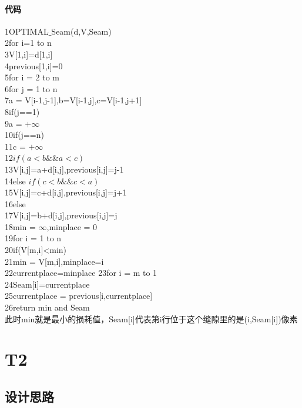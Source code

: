 \documentclass{article}
\begin{document}
\begin{CJK}{UTF8}{gkai}
\paragraph{代码}
1\qquad OPTIMAL$\_$Seam(d,V,Seam)\\
2\qquad for i=1 to n\\
3\qquad \qquad V[1,i]=d[1,i]\\
4\qquad \qquad previous[1,i]=0\\
5\qquad for i = 2 to  m\\
6\qquad\qquad for j = 1 to n\\
7\qquad\qquad\qquad a = V[i-1,j-1],b=V[i-1,j],c=V[i-1,j+1]\\
8\qquad\qquad\qquad if(j==1)\\
9\qquad\qquad\qquad\qquad a = $+\infty$\\
10\qquad\qquad\qquad if(j==n)\\
11\qquad\qquad\qquad\qquad c = $+\infty$\\
12\qquad\qquad\qquad $if(a<b\&\&a<c)$\\
13\qquad\qquad\qquad\qquad V[i,j]=a+d[i,j],previous[i,j]=j-1\\
14\qquad\qquad\qquad else $if(c<b\&\&c<a)$\\
15\qquad\qquad\qquad\qquad V[i,j]=c+d[i,j],previous[i,j]=j+1\\
16\qquad\qquad\qquad else\\
17\qquad\qquad\qquad\qquad V[i,j]=b+d[i,j],previous[i,j]=j\\
18\qquad min = $\infty$,minplace = 0\\
19\qquad for i = 1 to  n\\
20\qquad \qquad if(V[m,i]<min)\\
21\qquad\qquad\qquad min = V[m,i],minplace=i\\
22\qquad currentplace=minplace
23\qquad for i = m to  1\\
24\qquad \qquad Seam[i]=currentplace\\
25\qquad \qquad currentplace = previous[i,currentplace]\\
26\qquad return min and Seam\\
此时min就是最小的损耗值，Seam[i]代表第i行位于这个缝隙里的是(i,Seam[i])像素
\section{T2} 
\subsection{设计思路}

\end{CJK}
\end{document}
